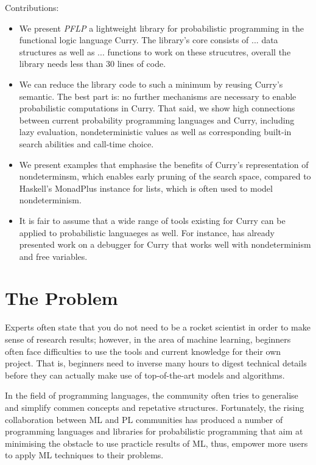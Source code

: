 \documentclass[
12pt, %
a4paper, %
oneside, %
]{llncs}
\begin{document}
Contributions:
\begin{itemize}
\item We present \emph{PFLP} a lightweight library for probabilistic
  programming in the functional logic language Curry. %
  The library's core consists of ... data structures as well as
  ... functions to work on these strucutres, overall the library needs
  less than 30 lines of code. %
\item We can reduce the library code to such a minimum by reusing Curry's
  semantic. %
  The best part is: no further mechanisms are necessary to enable
  probabilistic computations in Curry. %
  That said, we show high connections between current probability
  programming languages and Curry, including lazy evaluation,
  nondeterministic values as well as corresponding built-in search
  abilities and call-time choice. %
\item We present examples that emphasise the benefits of Curry's
  representation of nondeterminsm, which enables early pruning of the
  search space, compared to Haskell's MonadPlus instance for lists,
  which is often used to model nondeterminism. %
\item It is fair to assume that a wide range of tools existing for
  Curry can be applied to probabilistic languaeges as well. %
  For instance, \cite{Brassel-BIO} has already presented work on a
  debugger for Curry that works well with nondeterminism and free
  variables. %
\end{itemize}

\section{The Problem}

Experts often state that you do not need to be a rocket scientist in
order to make sense of research results; however, in the area of
machine learning, beginners often face difficulties to use the tools
and current knowledge for their own project. %
That is, beginners need to inverse many hours to digest technical
details before they can actually make use of top-of-the-art models and
algorithms. %

In the field of programming languages, the community often tries to
generalise and simplify commen concepts and repetative structures. %
Fortunately, the rising collaboration between ML and PL communities
has produced a number of programming languages and libraries for
probabilistic programming that aim at minimising the obstacle to use
practicle results of ML, thus, empower more users to apply ML
techniques to their problems. %
\end{document}
